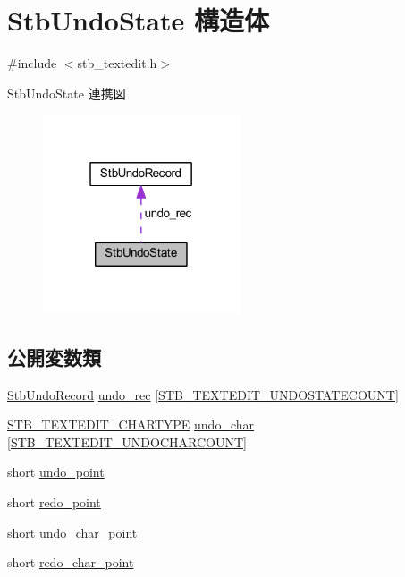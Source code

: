 \hypertarget{struct_stb_undo_state}{}\section{Stb\+Undo\+State 構造体}
\label{struct_stb_undo_state}


{\ttfamily \#include $<$stb\+\_\+textedit.\+h$>$}



Stb\+Undo\+State 連携図\nopagebreak
\begin{figure}[H]
\begin{center}
\leavevmode
\includegraphics[width=166pt]{struct_stb_undo_state__coll__graph}
\end{center}
\end{figure}
\subsection*{公開変数類}
\begin{DoxyCompactItemize}
\item 
\mbox{\hyperlink{struct_stb_undo_record}{Stb\+Undo\+Record}} \mbox{\hyperlink{struct_stb_undo_state_a8cb07be8f304d1620b50bd024709023f}{undo\+\_\+rec}} \mbox{[}\mbox{\hyperlink{stb__textedit_8h_afa79483143df87a1497010712b3dfaf9}{S\+T\+B\+\_\+\+T\+E\+X\+T\+E\+D\+I\+T\+\_\+\+U\+N\+D\+O\+S\+T\+A\+T\+E\+C\+O\+U\+NT}}\mbox{]}
\item 
\mbox{\hyperlink{stb__textedit_8h_a6e64031a061922e3a48d88fd8623f4c3}{S\+T\+B\+\_\+\+T\+E\+X\+T\+E\+D\+I\+T\+\_\+\+C\+H\+A\+R\+T\+Y\+PE}} \mbox{\hyperlink{struct_stb_undo_state_a88320a054aaf18ca122c2b23903a8677}{undo\+\_\+char}} \mbox{[}\mbox{\hyperlink{stb__textedit_8h_a15cbcac55cf92003c28c44734422756a}{S\+T\+B\+\_\+\+T\+E\+X\+T\+E\+D\+I\+T\+\_\+\+U\+N\+D\+O\+C\+H\+A\+R\+C\+O\+U\+NT}}\mbox{]}
\item 
short \mbox{\hyperlink{struct_stb_undo_state_ad29a8695b3e8252ac164d0c2d0be7d7c}{undo\+\_\+point}}
\item 
short \mbox{\hyperlink{struct_stb_undo_state_a719ba014b2db8a8ea55739664b445af0}{redo\+\_\+point}}
\item 
short \mbox{\hyperlink{struct_stb_undo_state_ad5c08b1f8c24678c44407f0ca805afcf}{undo\+\_\+char\+\_\+point}}
\item 
short \mbox{\hyperlink{struct_stb_undo_state_a928f655e4af8945a14d99e944441704a}{redo\+\_\+char\+\_\+point}}
\end{DoxyCompactItemize}


